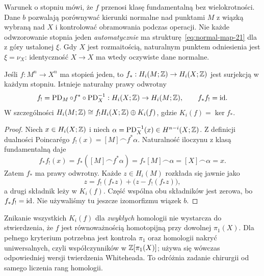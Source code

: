 Warunek o stopniu mówi, że $f$ przenosi klasę
fundamentalną bez wielokrotności. Dane $b$ pozwalają
porównywać kierunki normalne nad punktami $M$
z wiązką wybraną nad $X$ i kontrolować obramowania
podczas operacji. Nie każde odwzorowanie stopnia jeden
\emph{automatycznie} ma strukturę~\eqref{eq:normal-map-21}
dla z góry ustalonej $\xi$. Gdy $X$ jest
rozmaitością, naturalnym punktem odniesienia jest
$\xi=\nu_X$: identyczność $X\to X$ ma wtedy
oczywiste dane normalne.

\begin{lemat}
\label{lem:split-normalne-21}
Jeśli $f:M^n\to X^n$ ma stopień jeden, to
$f_*:H_i(M;\mathbb{Z})\to H_i(X;\mathbb{Z})$ jest surjekcją
w każdym stopniu. Istnieje naturalny prawy odwrotny
\[
 f_!=\operatorname{PD}_M\circ f^*
       \circ\operatorname{PD}_X^{-1}:H_i(X;\mathbb{Z})\to H_i(M;\mathbb{Z}),
 \qquad f_*f_!=\mathrm{id}.
\]
W szczególności
$H_i(M;\mathbb{Z})\cong f_!H_i(X;\mathbb{Z})\oplus K_i(f)$,
gdzie $K_i(f)=\ker f_*$.
\end{lemat}
\begin{proof}
Niech $x\in H_i(X;\mathbb{Z})$ i niech
$\alpha=\operatorname{PD}_X^{-1}(x)
\in H^{n-i}(X;\mathbb{Z})$.
Z definicji dualności Poincarégo
$f_!(x)=[M]\frown f^*\alpha$.
Naturalność iloczynu z klasą fundamentalną daje
\[
 f_*f_!(x)
 =f_*([M]\frown f^*\alpha)
 =f_*[M]\frown\alpha
 =[X]\frown\alpha=x.
\]
Zatem $f_*$ ma prawy odwrotny. Każde
$z\in H_i(M)$ rozkłada się jawnie jako
\[
 z=f_!(f_*z)+\bigl(z-f_!(f_*z)\bigr),
\]
a drugi składnik leży w $K_i(f)$.
Część wspólna obu składników jest zerowa,
bo $f_*f_!=\mathrm{id}$. Nie używaliśmy tu jeszcze
izomorfizmu wiązek $b$.
\end{proof}

\begin{uwaga}
Znikanie wszystkich $K_i(f)$ dla \emph{zwykłych}
homologii nie wystarcza do stwierdzenia, że $f$
jest równoważnością homotopijną przy dowolnej
$\pi_1(X)$. Dla pełnego kryterium potrzebna
jest kontrola $\pi_1$ oraz homologii nakryć
uniwersalnych, czyli współczynników w
$\mathbb{Z}[\pi_1(X)]$; używa się wówczas odpowiedniej
wersji twierdzenia Whiteheada. To odróżnia
zadanie chirurgii od samego liczenia rang homologii.
\end{uwaga}


